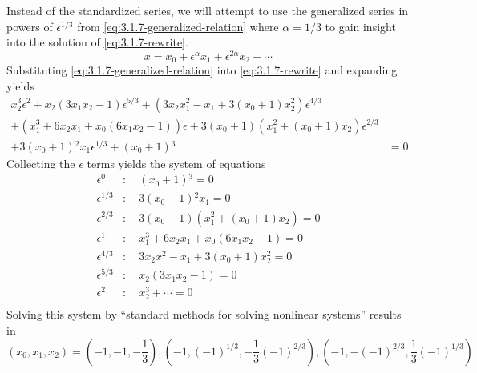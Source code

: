\documentclass[12pt]{article}
\begin{document}
Instead of the standardized series, we will attempt to use the generalized
series in powers of $\epsilon^{1/3}$ from \cref{eq:3.1.7-generalized-relation}
where $\alpha=1/3$ to gain insight into the solution of \cref{eq:3.1.7-rewrite}.
\begin{equation}
  \label{eq:3.1.7-generalized-relation}
  x=x_0+\epsilon^{\alpha} x_1 + \epsilon^{2\alpha}x_2+\cdots
\end{equation}
Substituting \cref{eq:3.1.7-generalized-relation} into \cref{eq:3.1.7-rewrite}
and expanding yields
\begin{equation*}
  \begin{split}
    x_2^3 \epsilon ^2
    +x_2 \left(3 x_1 x_2-1\right) \epsilon ^{5/3}
    +\left(3 x_2 x_1^2-x_1+3 \left(x_0+1\right) x_2^2\right) \epsilon^{4/3} \\
    +\left(x_1^3+6 x_2 x_1+x_0\left(6 x_1 x_2-1\right)\right) \epsilon
    +3\left(x_0+1\right) \left(x_1^2+\left(x_0+1\right) x_2\right) \epsilon^{2/3} \\
    +3\left(x_0+1\right){}^2 x_1 \epsilon^{1/3}
    +\left(x_0+1\right){}^3&=0.
  \end{split}
\end{equation*}
Collecting the $\epsilon$ terms yields the system of equations
\begin{equation*}
  \begin{aligned}
    \epsilon^0 &:\quad \left(x_0+1\right){}^3=0 \\
    \epsilon^{1/3} &:\quad 3 \left(x_0+1\right){}^2 x_1=0 \\
    \epsilon^{2/3} &:\quad 3 \left(x_0+1\right) \left(x_1^2+\left(x_0+1\right) x_2\right)=0 \\
    \epsilon^{1} &:\quad x_1^3+6 x_2 x_1+x_0 \left(6 x_1 x_2-1\right)=0 \\
    \epsilon^{4/3} &:\quad 3 x_2 x_1^2-x_1+3 \left(x_0+1\right) x_2^2=0 \\
    \epsilon^{5/3} &:\quad x_2 \left(3 x_1 x_2-1\right)=0 \\
    \epsilon^{2} &:\quad x_2^3+\cdots=0 \\
  \end{aligned}
\end{equation*}
Solving this system by ``standard methods for solving nonlinear systems''
results in
\begin{equation*}
  (x_0,x_1,x_2) = {\left(-1, -1, -\frac{1}{3}\right),
    \left( -1,{(-1)}^{1/3},-\frac{1}{3}{(-1)}^{2/3} \right),
    \left( -1,-{(-1)}^{2/3},\frac{1}{3}{(-1)}^{1/3} \right)}
\end{equation*}
\end{document}
